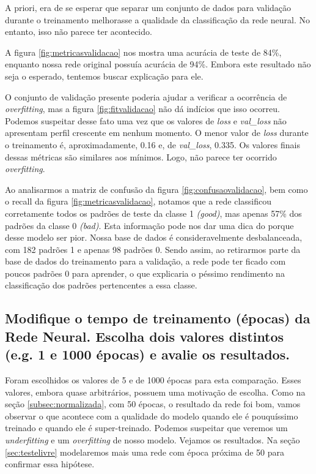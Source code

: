 \documentclass[12pt]{article}
\begin{document}
A priori, era de se esperar que separar um conjunto de dados para validação durante o treinamento melhorasse a qualidade da classificação da rede neural. No entanto, isso não parece ter acontecido.

A figura \ref{fig:metricasvalidacao} nos mostra uma acurácia de teste de 84\%, enquanto nossa rede original possuía acurácia de 94\%. Embora este resultado não seja o esperado, tentemos buscar explicação para ele.

O conjunto de validação presente poderia ajudar a verificar a ocorrência de \textit{overfitting}, mas a figura \ref{fig:fitvalidacao} não dá indícios que isso ocorreu. Podemos suspeitar desse fato uma vez que os valores de \textit{loss} e \textit{val\_loss} não apresentam perfil crescente em nenhum momento. O menor valor de \textit{loss} durante o treinamento é, aproximadamente, 0.16 e, de \textit{val\_loss}, 0.335. Os valores finais dessas métricas são similares aos mínimos. Logo, não parece ter ocorrido \textit{overfitting}.

Ao analisarmos a matriz de confusão da figura \ref{fig:confusaovalidacao}, bem como o recall da figura \ref{fig:metricasvalidacao}, notamos que a rede classificou corretamente todos os padrões de teste da classe 1 \textit{(good)}, mas apenas 57\% dos padrões da classe 0 \textit{(bad)}. Esta informação pode nos dar uma dica do porque desse modelo ser pior. Nossa base de dados é consideravelmente desbalanceada, com 182 padrões 1 e apenas 98 padrões 0. Sendo assim, ao retirarmos parte da base de dados do treinamento para a validação, a rede pode ter ficado com poucos padrões 0 para aprender, o que explicaria o péssimo rendimento na classificação dos padrões pertencentes a essa classe.

\subsection{Modifique o tempo de treinamento (épocas) da Rede Neural. Escolha dois valores distintos (e.g. 1 e 1000 épocas) e avalie os resultados.}

Foram escolhidos os valores de 5 e de 1000 épocas para esta comparação. Esses valores, embora quase arbitrários, possuem uma motivação de escolha. Como na seção \ref{subsec:normalizada}, com 50 épocas, o resultado da rede foi bom, vamos observar o que acontece com a qualidade do modelo quando ele é pouquíssimo treinado e quando ele é super-treinado. Podemos suspeitar que veremos um \textit{underfitting} e um \textit{overfitting} de nosso modelo. Vejamos os resultados. Na seção \ref{sec:testelivre} modelaremos mais uma rede com época próxima de 50 para confirmar essa hipótese.
\end{document}
